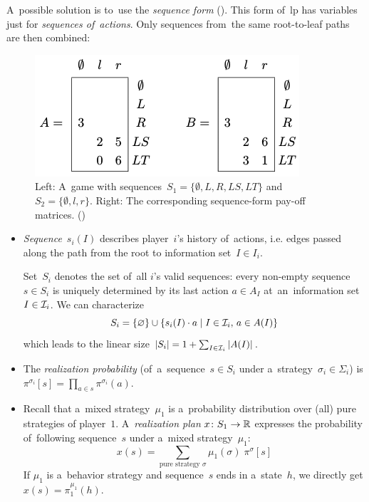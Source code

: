A~possible solution is to~use the \emph{sequence form} (\cite[pp.~70--73]{AGT07}).
This form of~\acrshort{lp} has variables just for \emph{sequences of~actions}.
Only sequences from~the same root-to-leaf paths are then combined:
\begin{figure}[H]
  \centering
  \tiny
  \def\svgwidth{.5\textwidth}
  
  \includegraphics[width=.4\textwidth]{../img/sequence-form.png}
  \def\captionTitle{Left: A~game with sequences~$S_1 = \{\emptyset, L, R, LS, LT\}$ and $S_2 = \{\emptyset, l, r \}$.
    Right: The corresponding sequence-form pay-off matrices.}
  \caption[The sequence-form pay-off matrices]{\captionTitle{} (\cite[p.~67]{AGT07})}
  \label{fig:sequence-form}
\end{figure}
\noindent
\begin{itemize}
  \item \emph{Sequence}~$s_i(I)$ describes player~$i$'s history of~actions, i.e. edges passed along the path from the root to information set~$I\in I_i$.

    Set~$S_i$ denotes the set of~all $i$'s valid sequences:
    every non-empty sequence $s\in S_i$ is uniquely determined by its last action $a\in A_{I}$ at~an~information set~$I \in \mathcal{I}_i$.
    We can characterize
    \[
      S_i = \{\varnothing\} \cup \{ s_i(I) \cdot a \mid I\in\mathcal{I}_i,\, a\in A(I) \}
    \]
    which leads to the linear size $\left\vert S_i \right\vert = 1 + \sum_{I\in\mathcal{I}_i} \left\vert A(I) \right\vert$.

  \item The \emph{realization probability} (of~a~sequence~$s \in S_i$ under a~strategy~$\sigma_i \in \Sigma_i$) is $\pi^{\sigma_i} [s] = \prod_{a \in s} \pi^{\sigma_i}(a)$.

  \item Recall that a~mixed strategy~$\mu_1$ is a~probability distribution over (all) pure strategies of player~$1$.
    A~\emph{realization plan}\footnotemark{} $x\colon S_1 \to \mathbb{R}$ expresses the probability of~following sequence~$s$ under a~mixed strategy~$\mu_1$:
    \[
      x(s) = \sum _{\textrm{pure strategy } \sigma} \mu_1(\sigma)\; \pi^{\sigma}[s]
    \]
    If $\mu_1$ is a~behavior strategy and sequence~$s$ ends in a~state~$h$, we directly get $x(s) = \pi^{\mu_1}_1(h)$.
\end{itemize}

